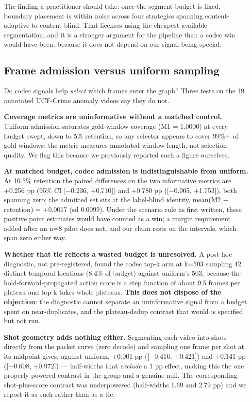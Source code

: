 \documentclass[sigconf,review,anonymous]{acmart}
\begin{document}
The finding a practitioner should take: once the segment budget is fixed, boundary placement
is within noise across four strategies spanning content-adaptive to content-blind. That
licenses using the cheapest available segmentation, and it is a stronger argument for the
pipeline than a codec win would have been, because it does not depend on our signal being
special.

\subsection{Frame admission versus uniform sampling}

Do codec signals help \emph{select} which frames enter the graph? Three tests on the 19 annotated
UCF-Crime anomaly videos say they do not.

\textbf{Coverage metrics are uninformative without a matched control.} Uniform admission saturates
gold-window coverage (M1 = 1.0000) at every budget swept, down to 5\% retention, so any
selector appears to cover 99\%+ of gold windows: the metric measures annotated-window length,
not selection quality. We flag this because we previously reported such a figure ourselves.

\textbf{At matched budget, codec admission is indistinguishable from uniform.} At 10.5\% retention
the paired differences on the two informative metrics are +0.256 pp (95\% CI {[}\ensuremath{-}0.236, +0.710{]})
and +0.780 pp ({[}\ensuremath{-}0.005, +1.753{]}), both spanning zero; the admitted set sits at the
label-blind identity, mean(M2 \ensuremath{-} retention) = +0.0017 (sd 0.0099). Under the scenario rule as
first written, these positive point estimates would have counted as a win; a margin
requirement added after an n=8 pilot does not, and our claim rests on the intervals, which
span zero either way.

\textbf{Whether that tie reflects a wasted budget is unresolved.} A post-hoc diagnostic, not
pre-registered, found the codec top-k arm at k=503 sampling 42 distinct temporal locations
(8.4\% of budget) against uniform's 503, because the hold-forward-propagated action score is a
step function of about 9.5 frames per plateau and top-k takes whole plateaus. \textbf{This does
not dispose of the objection}: the diagnostic cannot separate an uninformative signal from a
budget spent on near-duplicates, and the plateau-dedup contrast that would is specified but not
run.

\textbf{Shot geometry adds nothing either.} Segmenting each video into shots directly from the
packet curve (zero decode) and sampling one frame per shot at its midpoint gives, against
uniform, +0.001 pp ({[}\ensuremath{-}0.416, +0.421{]}) and +0.141 pp ({[}\ensuremath{-}0.608, +0.972{]}) --- half-widths that
\emph{exclude} a 1 pp effect, making this the one properly powered contrast in the group and a
genuine null. The corresponding shot-plus-score contrast was underpowered (half-widths 1.69
and 2.79 pp) and we report it as such rather than as a tie.
\end{document}
